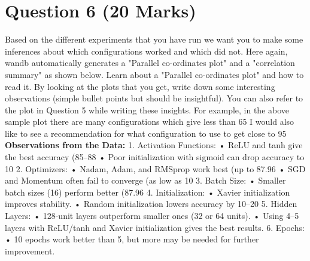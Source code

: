 \documentclass{article}
\begin{document}
\section{Question 6 (20 Marks)}
Based on the different experiments that you have run we want you to make some inferences about which configurations worked and which did not. 
Here again, wandb automatically generates a "Parallel co-ordinates plot" and a "correlation summary" as shown below. Learn about a "Parallel co-ordinates plot" and how to read it.
By looking at the plots that you get, write down some interesting observations (simple bullet points but should be insightful). You can also refer to the plot in Question 5 while writing these insights. For example, in the above sample plot there are many configurations which give less than 65%
I would also like to see a recommendation for what configuration to use to get close to 95%
\textbf{Observations from the Data:}
1.	Activation Functions:
	•	ReLU and tanh give the best accuracy (85–88%
	•	Poor initialization with sigmoid can drop accuracy to 10%
2.	Optimizers:
	•	Nadam, Adam, and RMSprop work best (up to 87.96%
	•	SGD and Momentum often fail to converge (as low as 10%
3.	Batch Size:
	•	Smaller batch sizes (16) perform better (87.96%
4.	Initialization:
	•	Xavier initialization improves stability.
	•	Random initialization lowers accuracy by 10–20%
5.	Hidden Layers:
	•	128-unit layers outperform smaller ones (32 or 64 units).
	•	Using 4–5 layers with ReLU/tanh and Xavier initialization gives the best results.
6.	Epochs:
	•	10 epochs work better than 5, but more may be needed for further improvement.
\end{document}
